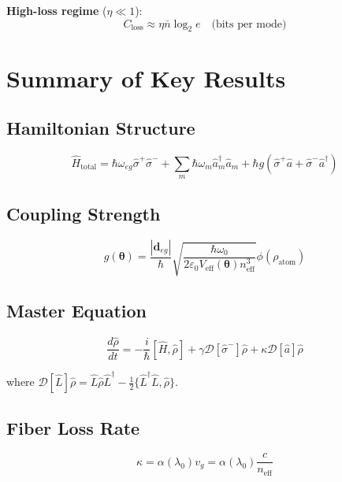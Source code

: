 \documentclass[12pt,a4paper]{article}
\begin{document}
\textbf{High-loss regime} ($\eta \ll 1$):
\begin{equation}
C_{\text{loss}} \approx \eta\bar{n}\log_2 e \quad \text{(bits per mode)}
\end{equation}

\section{Summary of Key Results}

\subsection{Hamiltonian Structure}

\begin{equation}
\boxed{\hat{H}_{\text{total}} = \hbar\omega_{eg}\hat{\sigma}^+\hat{\sigma}^- + \sum_m \hbar\omega_m \hat{a}_m^\dagger\hat{a}_m + \hbar g(\hat{\sigma}^+\hat{a} + \hat{\sigma}^-\hat{a}^\dagger)}
\end{equation}

\subsection{Coupling Strength}

\begin{equation}
\boxed{g(\boldsymbol{\theta}) = \frac{|\mathbf{d}_{eg}|}{\hbar}\sqrt{\frac{\hbar\omega_0}{2\varepsilon_0 V_{\text{eff}}(\boldsymbol{\theta}) n_{\text{eff}}^3}} \phi(\rho_{\text{atom}})}
\end{equation}

\subsection{Master Equation}

\begin{equation}
\boxed{\frac{d\hat{\rho}}{dt} = -\frac{i}{\hbar}[\hat{H}, \hat{\rho}] + \gamma\mathcal{D}[\hat{\sigma}^-]\hat{\rho} + \kappa\mathcal{D}[\hat{a}]\hat{\rho}}
\end{equation}

where $\mathcal{D}[\hat{L}]\hat{\rho} = \hat{L}\hat{\rho}\hat{L}^\dagger - \frac{1}{2}\{\hat{L}^\dagger\hat{L}, \hat{\rho}\}$.

\subsection{Fiber Loss Rate}

\begin{equation}
\boxed{\kappa = \alpha(\lambda_0) v_g = \alpha(\lambda_0)\frac{c}{n_{\text{eff}}}}
\end{equation}
\end{document}
